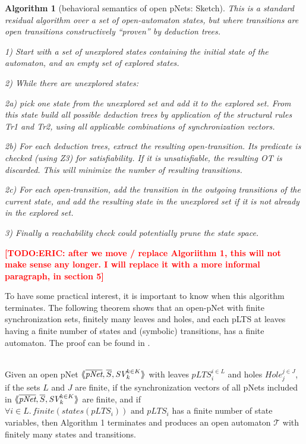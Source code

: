 \documentclass{lncs/llncs}
\newcommand{\TODO}[1]{\textcolor{red}{\textbf{[TODO:#1]}}}
\newtheorem{alg}[theorem]{Algorithm}
\begin{document}
\begin{alg}[behavioral semantics of open pNets: Sketch]
This is a standard residual algorithm over a set of open-automaton
states, but where transitions are open transitions
constructively ``proven'' by deduction trees.

1) Start with a set of unexplored states containing the initial state
of the automaton, and an empty set of explored states.

2) While there are unexplored states:

2a) pick one state from the unexplored set and add it to the explored
set. From this state
build all possible deduction trees by application of the structural
rules Tr1 and Tr2, using all applicable combinations
of synchronization vectors.

2b) For each deduction trees, extract the resulting
open-transition.
Its predicate is checked (using Z3) for  satisfiability. If it is
unsatisfiable, the resulting OT is discarded. This will minimize the
number of resulting transitions. 

2c) For each open-transition,  add the transition in the outgoing transitions of
the current state, and add the
resulting state in the unexplored set if it is not already in the
explored set.

3) Finally a reachability check could potentially
prune the state space.

\end{alg}

\TODO{ERIC: after we move / replace Algoriithm 1, this will not make sense any longer. I will replace it with a more informal paragraph, in section 5}

To have some practical interest, it is important to know when this
algorithm terminates. The following theorem shows that an open-pNet
with finite synchronization sets, finitely many leaves and
holes, and each pLTS at leaves having a finite number of states and
(symbolic) transitions, has a finite automaton. The proof can be found
in \cite{henrio:Forte2016}. 
 

\begin{theorem}\\
Given an open pNet $\mylangle \overline{\pNet},\overline{S}, \symb{SV}_k^{k\in K}\myrangle$ with leaves $pLTS_i^{i\in L}$ and holes $Hole_j^{j\in
  J}$, if the sets $L$ and $J$ are finite, if the synchronization vectors of all pNets 
  included in  $\mylangle \overline{\pNet},\overline{S}, \symb{SV}_k^{k\in K}\myrangle$ 
  are finite, and if
$\forall i \in L.\, finite{(states(pLTS_i))} \text{ and } pLTS_i$
has a finite number of state variables, then Algorithm 1 terminates
and produces an open automaton 
$\mathcal{T}$ with finitely many states and transitions.




\end{theorem}
\end{document}

